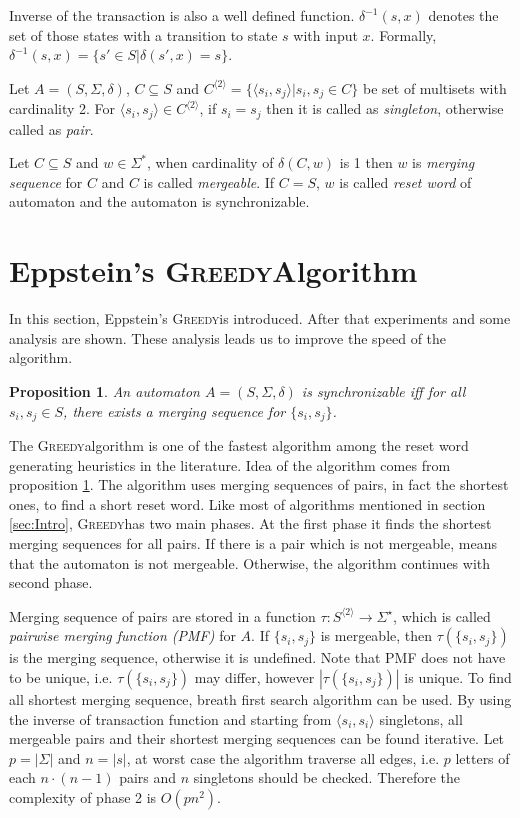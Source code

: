 \documentclass[12pt]{article}
\newtheorem{proposition}{Proposition}[section]
\newcommand{\greedyAlgo}{\textsc{Greedy}}
\begin{document}
Inverse of the transaction is also a well defined function. $\delta^{-1}(s,x)$ denotes the set of those states with a transition to state $s$ with input $x$. Formally, $\delta^{-1}(s,x) = \{ s' \in S | \delta(s',x)= s\}$.

Let $A=(S, \Sigma, \delta)$, $C \subseteq S$ and $C^{\langle 2 \rangle} = \{ \langle s_i, s_j \rangle | s_i,s_j \in C \}$ be set of multisets  with cardinality 2. For $\langle s_i, s_j \rangle \in C^{\langle 2 \rangle}$, if $s_i=s_j$ then it is called as \textit{singleton}, otherwise called as \textit{pair}. 

Let $C \subseteq S$ and $w \in \Sigma^*$, when cardinality of $\delta(C,w)$ is 1 then $w$ is \textit{merging sequence} for $C$ and $C$ is called \textit{mergeable}. If $C=S$, $w$ is called \textit{reset word} of automaton and the automaton is synchronizable.


\section{Eppstein's \greedyAlgo Algorithm}
In this section, Eppstein's \greedyAlgo is introduced. After that experiments and some analysis are shown. These analysis leads us to improve the speed of the algorithm.

\begin{proposition}
	\label{prop:synchronizable}
	An automaton $A=(S,\Sigma,\delta)$ is synchronizable iff for all  $s_i,s_j \in S$, there exists a merging sequence for $\{ s_i, s_j \}$.
\end{proposition}

The \greedyAlgo \space algorithm is one of the fastest algorithm among the reset word generating heuristics in the literature. Idea of the algorithm comes from proposition \ref{prop:synchronizable}. The algorithm uses merging sequences of pairs, in fact the shortest ones, to find a short reset word. Like most of algorithms mentioned in section \ref{sec:Intro}, \greedyAlgo \space has two main phases. At the first phase it finds the shortest merging sequences for all pairs. If there is a pair which is not mergeable, means that the automaton is not mergeable. Otherwise, the algorithm continues with second phase.

Merging sequence of pairs are stored in a function $\tau : S^{\langle 2 \rangle} \rightarrow \Sigma^\star$, which is called \textit{pairwise merging function (PMF)} for $A$. If $\{ s_i, s_j \}$ is mergeable, then $\tau(\{ s_i, s_j \})$ is the merging sequence, otherwise it is undefined. Note that PMF does not have to be unique, i.e. $\tau(\{ s_i, s_j \})$ may differ, however  $|\tau(\{ s_i, s_j \})|$ is unique. To find all shortest merging sequence, breath first search algorithm can be used. By using the inverse of transaction function and starting from $\langle s_i, s_i \rangle$ singletons, all mergeable pairs and their shortest merging sequences can be found iterative. Let $p=|\Sigma|$ and $n=|s|$, at worst case the algorithm traverse all edges, i.e. $p$ letters of each $n\cdot(n-1)$ pairs and $n$ singletons should be checked. Therefore the complexity of phase 2 is $O(pn^2)$. 
\end{document}
